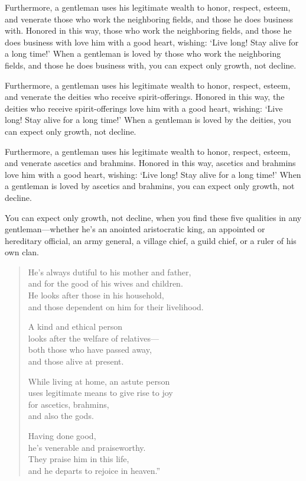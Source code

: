\documentclass[12pt,openany]{book}%
\begin{document}
Furthermore, a gentleman uses his legitimate wealth to honor, respect, esteem, and venerate those who work the neighboring fields, and those he does business with. Honored in this way, those who work the neighboring fields, and those he does business with love him with a good heart, wishing: ‘Live long! Stay alive for a long time!’ When a gentleman is loved by those who work the neighboring fields, and those he does business with, you can expect only growth, not decline. 

Furthermore, a gentleman uses his legitimate wealth to honor, respect, esteem, and venerate the deities who receive spirit-offerings. Honored in this way, the deities who receive spirit-offerings love him with a good heart, wishing: ‘Live long! Stay alive for a long time!’ When a gentleman is loved by the deities, you can expect only growth, not decline. 

Furthermore, a gentleman uses his legitimate wealth to honor, respect, esteem, and venerate ascetics and brahmins. Honored in this way, ascetics and brahmins love him with a good heart, wishing: ‘Live long! Stay alive for a long time!’ When a gentleman is loved by ascetics and brahmins, you can expect only growth, not decline. 

You can expect only growth, not decline, when you find these five qualities in any gentleman—whether he’s an anointed aristocratic king, an appointed or hereditary official, an army general, a village chief, a guild chief, or a ruler of his own clan. 

\begin{verse}%
He’s always dutiful to his mother and father, \\
and for the good of his wives and children. \\
He looks after those in his household, \\
and those dependent on him for their livelihood. 

A kind and ethical person \\
looks after the welfare of relatives—\\
both those who have passed away, \\
and those alive at present. 

While living at home, an astute person \\
uses legitimate means to give rise to joy \\
for ascetics, brahmins, \\
and also the gods. 

Having done good, \\
he’s venerable and praiseworthy. \\
They praise him in this life, \\
and he departs to rejoice in heaven.” 

%
\end{verse}
\end{document}
